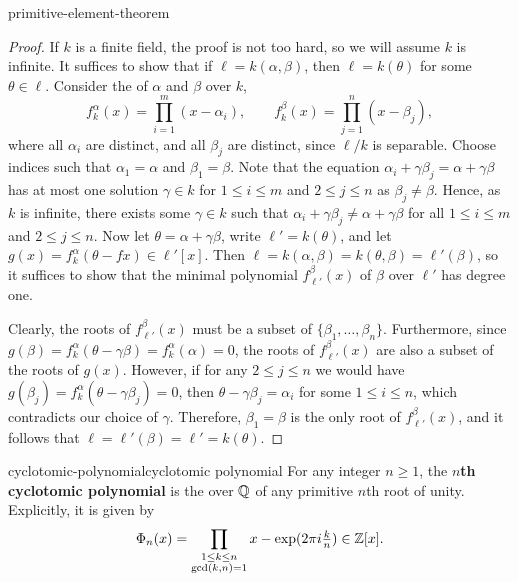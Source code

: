 \begin{example}{primitive-element-theorem}
    \begin{proof}
        If $k$ is a finite field, the proof is not too hard, so we will assume $k$ is infinite. It suffices to show that if $\ell = k(\alpha, \beta)$, then $\ell = k(\theta)$ for some $\theta \in \ell$. Consider the  of $\alpha$ and $\beta$ over $k$,
        \[ f_k^\alpha(x) = \prod_{i = 1}^{m} (x - \alpha_i), \qquad f_k^\beta(x) = \prod_{j = 1}^{n} (x - \beta_j) , \]
        where all $\alpha_i$ are distinct, and all $\beta_j$ are distinct, since $\ell/k$ is separable. Choose indices such that $\alpha_1 = \alpha$ and $\beta_1 = \beta$. Note that the equation $\alpha_i + \gamma \beta_j = \alpha + \gamma \beta$ has at most one solution $\gamma \in k$ for $1 \le i \le m$ and $2 \le j \le n$ as $\beta_j \ne \beta$. Hence, as $k$ is infinite, there exists some $\gamma \in k$ such that $\alpha_i + \gamma \beta_j \ne \alpha + \gamma \beta$ for all $1 \le i \le m$ and $2 \le j \le n$. Now let $\theta = \alpha + \gamma \beta$, write $\ell' = k(\theta)$, and let $g(x) = f_k^\alpha(\theta - fx) \in \ell'[x]$. Then $\ell = k(\alpha, \beta) = k(\theta, \beta) = \ell'(\beta)$, so it suffices to show that the minimal polynomial $f_{\ell'}^\beta(x)$ of $\beta$ over $\ell'$ has degree one.
        
        Clearly, the roots of $f_{\ell'}^\beta(x)$ must be a subset of $\{ \beta_1, \ldots, \beta_n \}$. Furthermore, since $g(\beta) = f_k^\alpha(\theta - \gamma \beta) = f_k^\alpha(\alpha) = 0$, the roots of $f_{\ell'}^\beta(x)$ are also a subset of the roots of $g(x)$. However, if for any $2 \le j \le n$ we would have $g(\beta_j) = f_k^\alpha(\theta - \gamma \beta_j) = 0$, then $\theta - \gamma \beta_j = \alpha_i$ for some $1 \le i \le n$, which contradicts our choice of $\gamma$. Therefore, $\beta_1 = \beta$ is the only root of $f_{\ell'}^\beta(x)$, and it follows that $\ell = \ell'(\beta) = \ell' = k(\theta)$.
    \end{proof}
\end{example}

\begin{topic}{cyclotomic-polynomial}{cyclotomic polynomial}
    For any integer $n \ge 1$, the \textbf{$n$th cyclotomic polynomial} is the  over $\mathbb{Q}$ of any primitive $n$th root of unity. Explicitly, it is given by
    \[ \Phi_n(x) = \prod_{\substack{1 \le k \le n \\ \gcd(k, n) = 1}} x - \exp(2 \pi i \tfrac{k}{n}) \in \mathbb{Z}[x] . \]
\end{topic}

